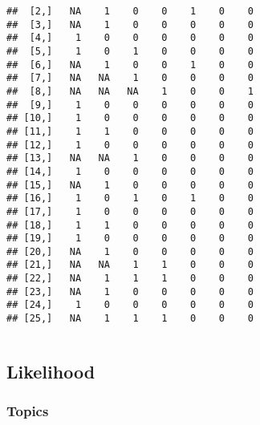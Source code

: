 \documentclass[color=usenames,dvipsnames]{beamer}\usepackage[]{graphicx}\usepackage[]{xcolor}
\makeatletter
\newenvironment{kframe}{%
 \def\at@end@of@kframe{}%
 \ifinner\ifhmode%
  \def\at@end@of@kframe{\end{minipage}}%
  \begin{minipage}{\columnwidth}%
 \fi\fi%
 \def\FrameCommand##1{\hskip\@totalleftmargin \hskip-\fboxsep
 \colorbox{shadecolor}{##1}\hskip-\fboxsep
     \hskip-\linewidth \hskip-\@totalleftmargin \hskip\columnwidth}%
 \MakeFramed {\advance\hsize-\width
   \@totalleftmargin\z@ \linewidth\hsize
   \@setminipage}}%
 {\par\unskip\endMakeFramed%
 \at@end@of@kframe}
\newenvironment{knitrout}{}{} %
\makeatother
\begin{document}
\begin{frame}[fragile]
\begin{columns}
\begin{column}{0.5\textwidth}
\begin{knitrout}
\begin{kframe}
\begin{verbatim}
##  [2,]   NA    1    0    0    1    0    0
##  [3,]   NA    1    0    0    0    0    0
##  [4,]    1    0    0    0    0    0    0
##  [5,]    1    0    1    0    0    0    0
##  [6,]   NA    1    0    0    1    0    0
##  [7,]   NA   NA    1    0    0    0    0
##  [8,]   NA   NA   NA    1    0    0    1
##  [9,]    1    0    0    0    0    0    0
## [10,]    1    0    0    0    0    0    0
## [11,]    1    1    0    0    0    0    0
## [12,]    1    0    0    0    0    0    0
## [13,]   NA   NA    1    0    0    0    0
## [14,]    1    0    0    0    0    0    0
## [15,]   NA    1    0    0    0    0    0
## [16,]    1    0    1    0    1    0    0
## [17,]    1    0    0    0    0    0    0
## [18,]    1    1    0    0    0    0    0
## [19,]    1    0    0    0    0    0    0
## [20,]   NA    1    0    0    0    0    0
## [21,]   NA   NA    1    1    0    0    0
## [22,]   NA    1    1    1    0    0    0
## [23,]   NA    1    0    0    0    0    0
## [24,]    1    0    0    0    0    0    0
## [25,]   NA    1    1    1    0    0    0
\end{verbatim}
\end{kframe}
\end{knitrout}
    \end{column}
  \end{columns}
\end{frame}



\subsection{Likelihood}


\begin{frame}[plain]
  \frametitle{Topics}
  \Large
\end{frame}
\end{document}
